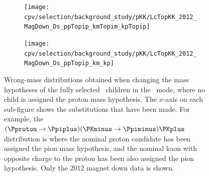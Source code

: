\begin{figure}
  \begin{subfigure}[b]{0.3\textwidth}
    \texttt{[image: cpv/selection/background\_study/pKK/LcTopKK\_2012\_MagDown\_Ds\_ppTopip\_kmTopim\_kpTopip]}
    \caption{\decay{\PDsplus}{\Ppiplus\Ppiminus\Ppiplus}}
    \label{fig:cpv:selection:background_study:pKK_meson:dsplus_pipipi}
  \end{subfigure}
  \begin{subfigure}[b]{0.3\textwidth}
    \texttt{[image: cpv/selection/background\_study/pKK/LcTopKK\_2012\_MagDown\_Ds\_ppTopip\_km\_kp]}
    \caption{\decay{\PDsplus}{\Ppiplus\PKminus\PKplus}}
    \label{fig:cpv:selection:background_study:pKK_meson:dsplus_piKK}
  \end{subfigure}

  \caption{%
    Wrong-mass distributions obtained when changing the mass hypotheses of the
    fully selected \PLambdac\ children in the \pKK\ mode, where no child is
    assigned the proton mass hypothesis.
    The $x$-axis on each sub-figure shows the substitutions that have been
    made.
    For example, the ${(\Pproton \to \Ppiplus)(\PKminus \to \Ppiminus)\PKplus}$ distribution is
    where the nominal proton candidate has been assigned the pion mass
    hypothesis, and the nominal kaon with opposite charge to the proton has
    been also assigned the pion hypothesis.
    Only the 2012 magnet down data is shown.
  }
  \label{fig:cpv:selection:background_study:pKK_meson}
\end{figure}


